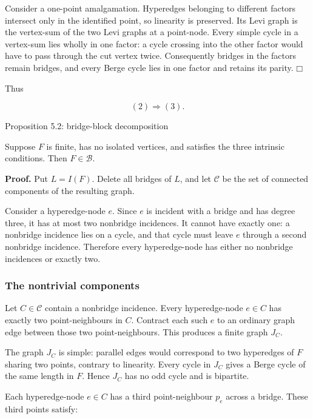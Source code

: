 \documentclass[11pt]{article}
\providecommand{\square}{\mdlgwhtsquare}
\begin{document}
Consider a one-point amalgamation. Hyperedges belonging to different factors intersect only in the identified point, so linearity is preserved. Its Levi graph is the vertex-sum of the two Levi graphs at a point-node. Every simple cycle in a vertex-sum lies wholly in one factor: a cycle crossing into the other factor would have to pass through the cut vertex twice. Consequently bridges in the factors remain bridges, and every Berge cycle lies in one factor and retains its parity. \(\square\)

Thus

\[
(2)\Longrightarrow(3). \tag{5.1}
\]

\label{proposition-5.2-bridge-block-decomposition}
\begin{propositionbox}{Proposition 5.2: bridge-block decomposition}

Suppose \(F\) is finite, has no isolated vertices, and satisfies the three intrinsic conditions. Then \(F\in\mathcal B\).

\end{propositionbox}
\textbf{Proof.} Put \(L=I(F)\). Delete all bridges of \(L\), and let \(\mathscr C\) be the set of connected components of the resulting graph.

Consider a hyperedge-node \(e\). Since \(e\) is incident with a bridge and has degree three, it has at most two nonbridge incidences. It cannot have exactly one: a nonbridge incidence lies on a cycle, and that cycle must leave \(e\) through a second nonbridge incidence. Therefore every hyperedge-node has either no nonbridge incidences or exactly two.

\subsubsection{The nontrivial components}\label{the-nontrivial-components}

Let \(C\in\mathscr C\) contain a nonbridge incidence. Every hyperedge-node \(e\in C\) has exactly two point-neighbours in \(C\). Contract each such \(e\) to an ordinary graph edge between those two point-neighbours. This produces a finite graph \(J_C\).

The graph \(J_C\) is simple: parallel edges would correspond to two hyperedges of \(F\) sharing two points, contrary to linearity. Every cycle in \(J_C\) gives a Berge cycle of the same length in \(F\). Hence \(J_C\) has no odd cycle and is bipartite.

Each hyperedge-node \(e\in C\) has a third point-neighbour \(p_e\) across a bridge. These third points satisfy:
\end{document}
